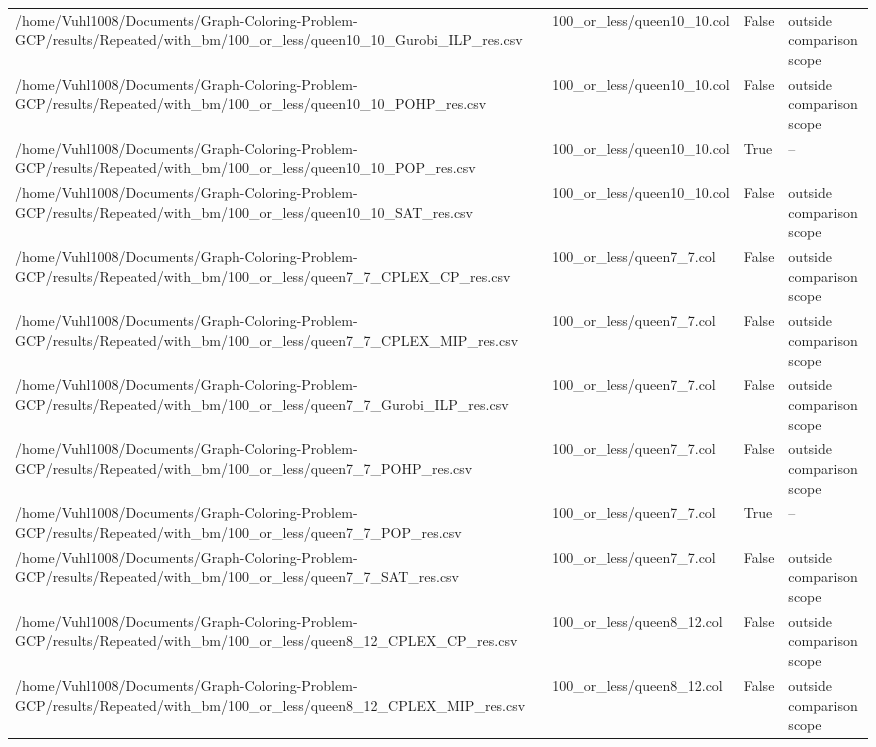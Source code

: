 \begin{table}[htbp]
\begin{tabular}{llll}
/home/Vuhl1008/Documents/Graph-Coloring-Problem-GCP/results/Repeated/with\_bm/100\_or\_less/queen10\_10\_Gurobi\_ILP\_res.csv & 100\_or\_less/queen10\_10.col & False & outside comparison scope \\
/home/Vuhl1008/Documents/Graph-Coloring-Problem-GCP/results/Repeated/with\_bm/100\_or\_less/queen10\_10\_POHP\_res.csv & 100\_or\_less/queen10\_10.col & False & outside comparison scope \\
/home/Vuhl1008/Documents/Graph-Coloring-Problem-GCP/results/Repeated/with\_bm/100\_or\_less/queen10\_10\_POP\_res.csv & 100\_or\_less/queen10\_10.col & True & -- \\
/home/Vuhl1008/Documents/Graph-Coloring-Problem-GCP/results/Repeated/with\_bm/100\_or\_less/queen10\_10\_SAT\_res.csv & 100\_or\_less/queen10\_10.col & False & outside comparison scope \\
/home/Vuhl1008/Documents/Graph-Coloring-Problem-GCP/results/Repeated/with\_bm/100\_or\_less/queen7\_7\_CPLEX\_CP\_res.csv & 100\_or\_less/queen7\_7.col & False & outside comparison scope \\
/home/Vuhl1008/Documents/Graph-Coloring-Problem-GCP/results/Repeated/with\_bm/100\_or\_less/queen7\_7\_CPLEX\_MIP\_res.csv & 100\_or\_less/queen7\_7.col & False & outside comparison scope \\
/home/Vuhl1008/Documents/Graph-Coloring-Problem-GCP/results/Repeated/with\_bm/100\_or\_less/queen7\_7\_Gurobi\_ILP\_res.csv & 100\_or\_less/queen7\_7.col & False & outside comparison scope \\
/home/Vuhl1008/Documents/Graph-Coloring-Problem-GCP/results/Repeated/with\_bm/100\_or\_less/queen7\_7\_POHP\_res.csv & 100\_or\_less/queen7\_7.col & False & outside comparison scope \\
/home/Vuhl1008/Documents/Graph-Coloring-Problem-GCP/results/Repeated/with\_bm/100\_or\_less/queen7\_7\_POP\_res.csv & 100\_or\_less/queen7\_7.col & True & -- \\
/home/Vuhl1008/Documents/Graph-Coloring-Problem-GCP/results/Repeated/with\_bm/100\_or\_less/queen7\_7\_SAT\_res.csv & 100\_or\_less/queen7\_7.col & False & outside comparison scope \\
/home/Vuhl1008/Documents/Graph-Coloring-Problem-GCP/results/Repeated/with\_bm/100\_or\_less/queen8\_12\_CPLEX\_CP\_res.csv & 100\_or\_less/queen8\_12.col & False & outside comparison scope \\
/home/Vuhl1008/Documents/Graph-Coloring-Problem-GCP/results/Repeated/with\_bm/100\_or\_less/queen8\_12\_CPLEX\_MIP\_res.csv & 100\_or\_less/queen8\_12.col & False & outside comparison scope \\

\end{tabular}
\end{table}
